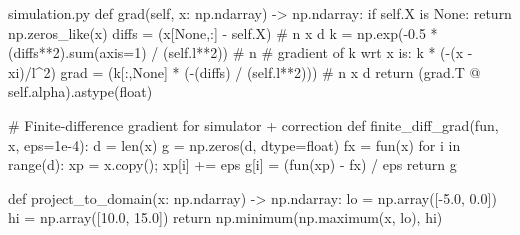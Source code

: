 \begin{filecontents*}{simulation.py}
    def grad(self, x: np.ndarray) -> np.ndarray:
        if self.X is None:
            return np.zeros_like(x)
        diffs = (x[None,:] - self.X)  # n x d
        k = np.exp(-0.5 * (diffs**2).sum(axis=1) / (self.l**2))  # n
        # gradient of k wrt x is: k * (-(x - xi)/l^2)
        grad = (k[:,None] * (-(diffs) / (self.l**2)))  # n x d
        return (grad.T @ self.alpha).astype(float)

# Finite-difference gradient for simulator + correction
def finite_diff_grad(fun, x, eps=1e-4):
    d = len(x)
    g = np.zeros(d, dtype=float)
    fx = fun(x)
    for i in range(d):
        xp = x.copy(); xp[i] += eps
        g[i] = (fun(xp) - fx) / eps
    return g

def project_to_domain(x: np.ndarray) -> np.ndarray:
    lo = np.array([-5.0, 0.0])
    hi = np.array([10.0, 15.0])
    return np.minimum(np.maximum(x, lo), hi)


\end{filecontents*}
